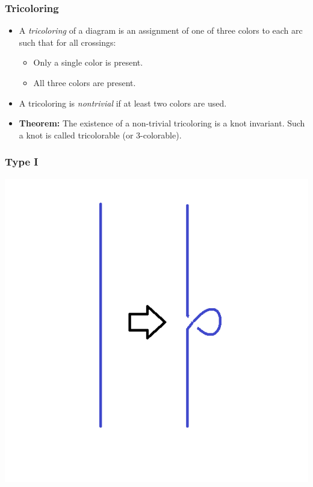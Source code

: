 \documentclass{beamer}
\begin{document}
\begin{frame}
  \frametitle{Tricoloring}
  \begin{itemize}
  \item A \textit{tricoloring} of a diagram is an assignment
    of one of three colors to each arc such that for all crossings:
    \begin{itemize}
      \pause
    \item Only a single color is present.
      \pause
    \item All three colors are present.
    \end{itemize}
    \pause
  \item A tricoloring is \textit{nontrivial} if at least two colors are used.
    \pause
  \item \textbf{Theorem:} The existence of a non-trivial tricoloring is a knot
    invariant. Such a knot is called tricolorable (or $3$-colorable).
  \end{itemize}
\end{frame}

\begin{frame}
  \frametitle{Type I}
  \begin{center}
    \includegraphics[scale=.4]{t1-c}
  \end{center}
\end{frame}
\end{document}
